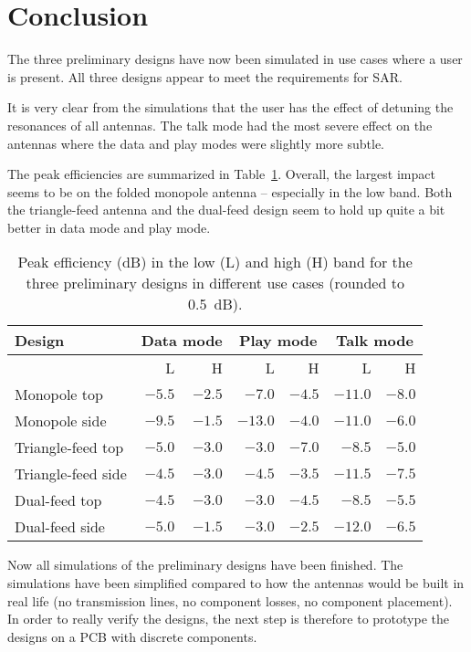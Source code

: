 \section{Conclusion}
The three preliminary designs have now been simulated in use cases where a user is present. All three designs appear to meet the requirements for SAR.

It is very clear from the simulations that the user has the effect of detuning the resonances of all antennas. The talk mode had the most severe effect on the antennas where the data and play modes were slightly more subtle.

The peak efficiencies are summarized in Table~\ref{tab:peakefficiencycomp}. Overall, the largest impact seems to be on the folded monopole antenna -- especially in the low band. Both the triangle-feed antenna and the dual-feed design seem to hold up quite a bit better in data mode and play mode.

\begin{table}[htbp]
    \centering
    \begin{tabular}{|l|r|r|r|r|r|r|}
        \hline
        Design             & \multicolumn{2}{c|}{Data mode}   & \multicolumn{2}{c|}{Play mode}   & \multicolumn{2}{c|}{Talk mode} \\
        \hline
         & L & H & L & H & L & H \\
        \hline
        Monopole top       & $-5.5$ & $-2.5$ & $-7.0 $  & $-4.5$ & $-11.0  $ & $-8.0$ \\
        Monopole side      & $-9.5$ & $-1.5$ & $-13.0 $ & $-4.0$ & $-11.0  $ & $-6.0$ \\
        \hline
        Triangle-feed top  & $-5.0$ & $-3.0$ & $-3.0  $ & $-7.0$ & $-8.5 $   & $-5.0$ \\
        Triangle-feed side & $-4.5$ & $-3.0$ & $-4.5$   & $-3.5$ & $-11.5$   & $-7.5$ \\
        \hline
        Dual-feed top   & $-4.5$ & $-3.0$ & $-3.0  $ & $-4.5$ & $-8.5 $   & $-5.5$ \\
        Dual-feed side  & $-5.0$ & $-1.5$ & $-3.0 $  & $-2.5$ & $-12.0  $ & $-6.5$ \\
        \hline
    \end{tabular}
    \caption{Peak efficiency (dB) in the low (L) and high (H) band for the three preliminary designs in different use cases (rounded to \SI{0.5}{dB}).}
    \label{tab:peakefficiencycomp}
\end{table}

Now all simulations of the preliminary designs have been finished. The simulations have been simplified compared to how the antennas would be built in real life (no transmission lines, no component losses, no component placement). In order to really verify the designs, the next step is therefore to prototype the designs on a PCB with discrete components.
